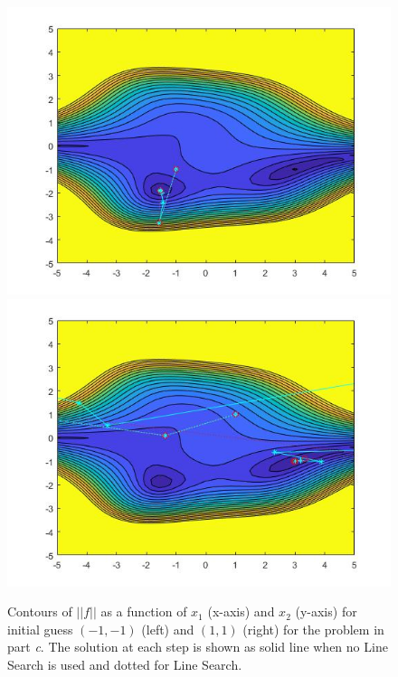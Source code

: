 \begin{figure}[tbh]
 \centering  
   {\includegraphics[width=0.49\linewidth]{fun3_a1.jpg}}   
   {\includegraphics[width=0.49\linewidth]{fun3_a2.jpg}}
  \caption{Contours of $||f||$ as a function of $x_{1}$ (x-axis) and $x_{2}$ (y-axis) for initial guess $(-1,-1)$ (left) and $(1,1)$ (right) for the problem in part \emph{c}. The solution at each step is shown as solid line when no Line Search is used and dotted for Line Search.}
   \label{fig:fig_c}
\end{figure} 